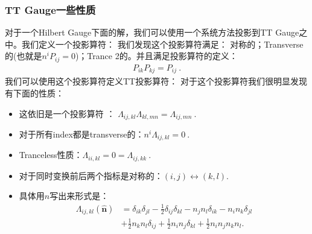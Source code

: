 \subsubsection{TT Gauge一些性质}\label{sec:ttgaugeprop}
\bigskip
{}

对于一个Hilbert Gauge下面的解，我们可以使用一个系统方法投影到TT Gauge之中。我们定义一个投影算符：
我们发现这个投影算符满足： 对称的；Transverse的(也就是$ n^iP_{ij} = 0 $)；Trance 2的。并且满足投影算符的定义：
\begin{align}
P_{ik}P_{kj}=P_{ij}\mathrm{~.}
\end{align}
我们可以使用这个投影算符定义TT投影算符：
对于这个投影算符我们很明显发现有下面的性质：
\begin{itemize}
\item 这依旧是一个投影算符 ： $
  \Lambda_{ij,kl}\Lambda_{kl,mn}=\Lambda_{ij,mn}\mathrm{~.} $
\item 对于所有index都是transverse的：$ n^i\Lambda_{ij,kl}=0\mathrm{~.} $
\item Tranceless性质：$ \Lambda_{ii,kl}=0 = \Lambda_{ij,kk}\mathrm{~.} $
\item 对于同时变换前后两个指标是对称的：$ (i,j)\leftrightarrow(k,l). $
\item 具体用$ n $写出来形式是：
  \begin{align}
    \Lambda_{ij,kl}(\hat{\mathbf{n}})&=\delta_{ik}\delta_{jl}-\frac{1}{2}\delta_{ij}\delta_{kl}-n_jn_l\delta_{ik}-n_in_k\delta_{jl}\\&\left.+\frac{1}{2}n_kn_l\delta_{ij}+\frac{1}{2}n_in_j\delta_{kl}+\frac{1}{2}n_in_jn_kn_l\right..
  \end{align}
\end{itemize}


